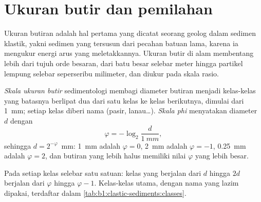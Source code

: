 \section{Ukuran butir dan pemilahan}\label{sec:b1:clastic-sediments:grain-size}

Ukuran butiran adalah hal pertama yang dicatat seorang geolog dalam sedimen klastik, yakni sedimen yang tersusun dari pecahan batuan lama, karena ia mengukur energi arus yang meletakkannya. Ukuran butir di alam membentang lebih dari tujuh orde besaran, dari batu besar selebar meter hingga partikel lempung selebar seperseribu milimeter, dan diukur pada skala rasio.

\begin{definition}\label{def:b1:clastic-sediments:grain-size}
\emph{Skala ukuran butir} sedimentologi membagi diameter butiran menjadi kelas-kelas yang batasnya berlipat dua dari satu kelas ke kelas berikutnya, dimulai dari \qty{1}{mm}; setiap kelas diberi nama (pasir, lanau\ldots). \emph{Skala phi} menyatakan diameter $d$ dengan
\[
  \varphi = -\log_2 \frac{d}{\qty{1}{mm}},
\]
sehingga $d = 2^{-\varphi}$~mm: \qty{1}{mm} adalah $\varphi = 0$, \qty{2}{mm} adalah
$\varphi = -1$, \qty{0.25}{mm} adalah $\varphi = 2$, dan butiran yang lebih halus memiliki nilai $\varphi$ yang lebih besar.
\end{definition}

Pada  setiap kelas  selebar satu satuan: kelas yang berjalan dari $d$ hingga $2d$ berjalan dari $\varphi$ hingga $\varphi - 1$. Kelas-kelas utama, dengan nama yang lazim dipakai, terdaftar dalam \cref{tab:b1:clastic-sediments:classes}.

